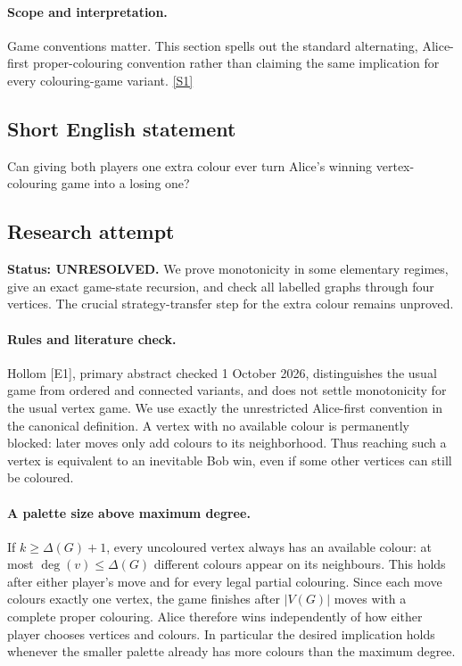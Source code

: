 \documentclass[11pt,a4paper]{article}
\newcommand{\sref}[2]{\hyperlink{source:#1:#2}{[S#2]}}
\begin{document}
\paragraph{Scope and interpretation.}

Game conventions matter. This section spells out the standard alternating, Alice-first proper-colouring convention rather than claiming the same implication for every colouring-game variant. \sref{1392}{1}

\subsection{Short English statement}

Can giving both players one extra colour ever turn Alice’s winning vertex-colouring game into a losing one?

\subsection{Research attempt}
\textbf{Status: UNRESOLVED.} We prove monotonicity in some elementary regimes, give an exact game-state recursion, and check all labelled graphs through four vertices. The crucial strategy-transfer step for the extra colour remains unproved.

\paragraph{Rules and literature check.}
Hollom [E1], primary abstract checked 1 October 2026, distinguishes the usual game from ordered and connected variants, and does not settle monotonicity for the usual vertex game. We use exactly the unrestricted Alice-first convention in the canonical definition. A vertex with no available colour is permanently blocked: later moves only add colours to its neighborhood. Thus reaching such a vertex is equivalent to an inevitable Bob win, even if some other vertices can still be coloured.

\paragraph{A palette size above maximum degree.}
If $k\ge\Delta(G)+1$, every uncoloured vertex always has an available colour: at most $\deg(v)\le\Delta(G)$ different colours appear on its neighbours. This holds after either player's move and for every legal partial colouring. Since each move colours exactly one vertex, the game finishes after $|V(G)|$ moves with a complete proper colouring. Alice therefore wins independently of how either player chooses vertices and colours. In particular the desired implication holds whenever the smaller palette already has more colours than the maximum degree.
\end{document}
